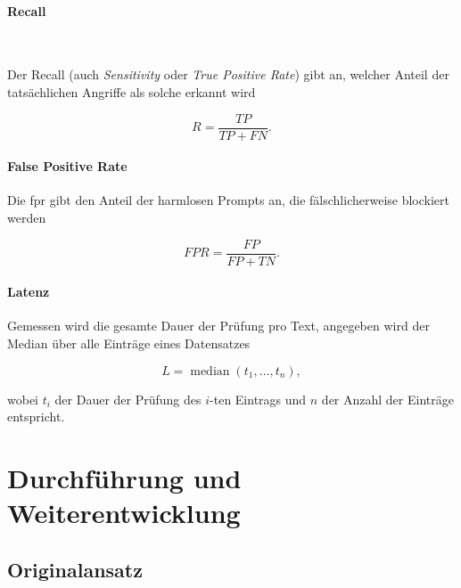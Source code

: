 \paragraph{Recall}~\cite[227]{sm29}

Der Recall (auch \textit{Sensitivity} oder \textit{True Positive Rate}) gibt an, welcher Anteil der tatsächlichen Angriffe als solche erkannt wird

\begin{equation}
  R = \frac{TP}{TP + FN} .
  \label{eq:recall}
\end{equation}

\paragraph{False Positive Rate~\cite[22]{sm27}}

Die \ac{fpr} gibt den Anteil der harmlosen Prompts an, die fälschlicherweise blockiert werden

\begin{equation}
  \mathit{FPR} = \frac{FP}{FP + TN} .
  \label{eq:fpr}
\end{equation}

\paragraph{Latenz~\cite[22]{sm27}}

Gemessen wird die gesamte Dauer der Prüfung pro Text, angegeben wird der Median über alle Einträge eines Datensatzes

\begin{equation}
  L = \operatorname{median}(t_1, \dots, t_n) ,
  \label{eq:latency}
\end{equation}

wobei $t_i$ der Dauer der Prüfung des $i$-ten Eintrags und $n$ der Anzahl der Einträge entspricht.

\section{Durchführung und Weiterentwicklung}

\subsection{Originalansatz}\label{subsec:original}

